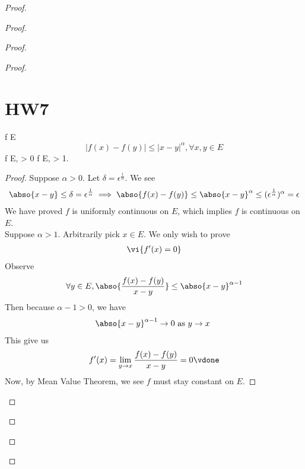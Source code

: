 \documentclass{report}
\begin{document}
\begin{proof}
\begin{proof}
\begin{proof}
\begin{proof}
\section{HW7}
\begin{question}{}{}
 f  E 
\[
|f(x) - f(y)| \leq |x - y|^\alpha, \forall x, y \in E
\]
 f  E,  \alpha > 0  f  E,  \alpha > 1.

\end{question}
\begin{proof}
Suppose $\alpha >0$. Let $\delta=\epsilon ^{\frac{1}{\alpha }}$. We see 
\begin{align*}
\abso{x-y}\leq \delta=\epsilon^{\frac{1}{\alpha }}\implies \abso{f(x)-f(y)}\leq \abso{x-y}^{\alpha }\leq (\epsilon ^{\frac{1}{\alpha }})^{\alpha }=\epsilon 
\end{align*}
We have proved $f$ is uniformly continuous on $E$, which implies $f$ is continuous on $E$.\\

Suppose $\alpha >1$. Arbitrarily pick $x\in E$. We only wish to prove 
\begin{align*}
  \vi{f'(x)=0}
\end{align*}
Observe 
\begin{align*}
\forall y\in E, \abso{\frac{f(x)-f(y)}{x-y}}\leq \abso{x-y}^{\alpha -1} 
\end{align*}
Then because $\alpha -1>0$, we have
\begin{align*}
\abso{x-y}^{\alpha -1}\to 0\text{ as $y\to x$ }
\end{align*}
This give us 
\begin{align*}
f'(x)=\lim_{y \to x}\frac{f(x)-f(y)}{x-y}=0 \vdone
\end{align*}
Now, by Mean Value Theorem, we see $f$ must stay constant on  $E$. 

\end{proof}
\begin{question}{}{}


\end{question}
\end{proof}
\end{proof}
\end{proof}
\end{proof}
\end{document}
